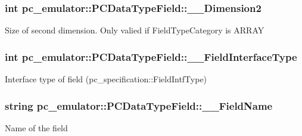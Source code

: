 \subsubsection[{\texorpdfstring{\+\_\+\+\_\+\+Dimension2}{__Dimension2}}]{\setlength{\rightskip}{0pt plus 5cm}int pc\+\_\+emulator\+::\+P\+C\+Data\+Type\+Field\+::\+\_\+\+\_\+\+Dimension2}\hypertarget{classpc__emulator_1_1PCDataTypeField_abc3e341571affb8839a811dcb79f77ca}{}\label{classpc__emulator_1_1PCDataTypeField_abc3e341571affb8839a811dcb79f77ca}
Size of second dimension. Only valied if Field\+Type\+Category is A\+R\+R\+AY 
\subsubsection[{\texorpdfstring{\+\_\+\+\_\+\+Field\+Interface\+Type}{__FieldInterfaceType}}]{\setlength{\rightskip}{0pt plus 5cm}int pc\+\_\+emulator\+::\+P\+C\+Data\+Type\+Field\+::\+\_\+\+\_\+\+Field\+Interface\+Type}\hypertarget{classpc__emulator_1_1PCDataTypeField_ae3bcb0938843c949e652b92b53bdd421}{}\label{classpc__emulator_1_1PCDataTypeField_ae3bcb0938843c949e652b92b53bdd421}
Interface type of field (pc\+\_\+specification\+::\+Field\+Intf\+Type) 
\subsubsection[{\texorpdfstring{\+\_\+\+\_\+\+Field\+Name}{__FieldName}}]{\setlength{\rightskip}{0pt plus 5cm}string pc\+\_\+emulator\+::\+P\+C\+Data\+Type\+Field\+::\+\_\+\+\_\+\+Field\+Name}\hypertarget{classpc__emulator_1_1PCDataTypeField_a67da027aea5ba30e6c8edccf5c2b15ee}{}\label{classpc__emulator_1_1PCDataTypeField_a67da027aea5ba30e6c8edccf5c2b15ee}
Name of the field 

